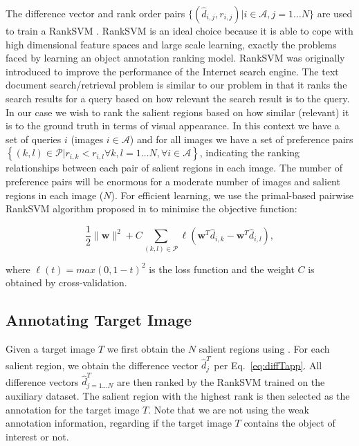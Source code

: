 \documentclass{bmvc2k}
\begin{document}
The difference vector and rank order pairs $\{(\hat{d}_{i,j},r_{i,j}) | i \in \mathcal{A}, j = 1 \ldots N \}$ are used to train a RankSVM \cite{Joachims_2002}. RankSVM is an ideal choice because it is able to cope with high dimensional feature spaces and large scale learning, exactly the problems faced by learning an object annotation ranking model.
RankSVM was originally introduced to improve the performance of the Internet search engine. The text document search/retrieval problem is similar to our problem in that it ranks the search results for a query based on how relevant the search result is to the query. In our case we wish to rank the salient regions based on how similar (relevant) it is to the ground truth in terms of visual appearance. In this context we have a set of queries $i$ (images $i \in \mathcal{A}$) and for all images we have a set of preference pairs $\left\lbrace (k,l) \in \mathcal{P} | r_{i,k} < r_{i,l} \forall k,l = 1 \ldots N, \forall i \in \mathcal{A} \right\rbrace$, indicating the ranking relationships between each pair of salient regions in each image. The number of preference pairs will be enormous for a moderate number of images and salient regions in each image ($N$). For efficient learning, we use the primal-based pairwise RankSVM algorithm proposed in \cite{Chapelle_2010} to minimise the objective function:

\begin{equation}
\frac{1}{2} \| \mathbf{w} \|^2 + C \sum_{(k,l) \in \mathcal{P}} \ell(\mathbf{w}^T \hat{d}_{i,k} - \mathbf{w}^T \hat{d}_{i,l}),
\end{equation}

\noindent where $\ell(t) = max(0,1-t)^2$ is the loss function and the weight $C$ is obtained by cross-validation.

\subsection{Annotating Target Image}

Given a target image $T$ we first obtain the $N$ salient regions using \citep{Alexewhatisobject}. For each salient region, we obtain the difference vector $\hat{d}^T_j$ per Eq.~\ref{eq:diffTapp}. All difference vectors $\hat{d}^T_{j=1\ldots N}$ are then ranked by the RankSVM trained on the auxiliary dataset. The salient region with the highest rank is then selected as the annotation for the target image $T$. Note that we are not using the weak annotation information, regarding if the target image $T$ contains the object of interest or not.
\end{document}
